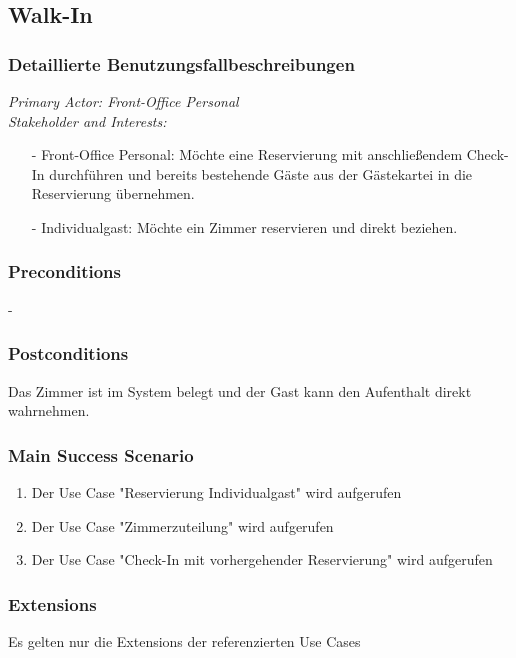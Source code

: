 \documentclass[./detailed_overview_usecases.tex]{subfiles}
\begin{document}
    \subsection{Walk-In}
    \subsubsection{Detaillierte Benutzungsfallbeschreibungen}

    \textit{Primary Actor: Front-Office Personal}
    \\
    \textit{Stakeholder and Interests:}
    \begin{itemize}
        \item[-] Front-Office Personal: Möchte eine Reservierung mit anschließendem Check-In durchführen und bereits bestehende Gäste aus der Gästekartei in die Reservierung übernehmen.
        \item[-] Individualgast: Möchte ein Zimmer reservieren und direkt beziehen.
    \end{itemize}

    \subsubsection*{Preconditions}
    -

    \subsubsection*{Postconditions}
    Das Zimmer ist im System belegt und der Gast kann den Aufenthalt direkt wahrnehmen.

    \subsubsection*{Main Success Scenario}
    \begin{enumerate}
        \item Der Use Case "Reservierung Individualgast" wird aufgerufen
        \item Der Use Case "Zimmerzuteilung" wird aufgerufen
        \item Der Use Case "Check-In mit vorhergehender Reservierung" wird aufgerufen
    \end{enumerate}

    \subsubsection*{Extensions}
    Es gelten nur die Extensions der referenzierten Use Cases
\end{document}

